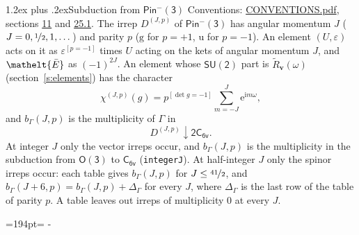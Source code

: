 \documentclass[10pt,a4paper]{article}
\makeatletter
\renewcommand\section{\@startsection{section}{1}{\z@}{-3ex plus -1ex minus -.2ex}%
  {1.2ex plus .2ex}{\normalfont\large\sffamily\bfseries\color{parttitle}}}
\newcommand{\needspace}[1]{\par\penalty-100\begingroup\dimen0=#1\relax\dimen2=\pagegoal
  \advance\dimen2-\pagetotal\ifdim\dimen0>\dimen2\relax\ifdim\dimen2>0pt\vfil\break\fi\fi
  \endgroup}
\numberwithin{equation}{section}
\newcommand{\eltfont}[1]{{\let\sigma\eltsigma\mathelt{#1}}}
\newcommand{\grp}[1]{\mathsf{#1}}
\newcommand{\elt}[1]{\eltfont{#1}}
\newcommand{\ptag}[1]{\mathrm{#1}}
\newcommand{\iverson}[1]{[#1]}
\newcommand{\restr}[2]{#1\!\downarrow#2}
\newcommand{\vv}{\mathbf{v}}
\newcommand{\iunit}{\mathrm{i}}
\newcommand{\expe}{\mathrm{e}}
\newcommand{\irrJp}[2]{D^{(#1,#2)}}
\newcommand{\barred}[1]{\bar{#1}}
\newcommand{\lift}[1]{\tilde{#1}}
\makeatother
\begin{document}
\section{Subduction from \texorpdfstring{$\grp{Pin^{-}(3)}$}{Pin(3)}}\label{s:subduction_parent}
Conventions: \href{../../CONVENTIONS.pdf}{CONVENTIONS.pdf}, sections \href{../../../rotation/CONVENTIONS.pdf\#conv.11}{11} and \href{../../CONVENTIONS.pdf\#conv.25.1}{25.1}.
\leavevmode\label{n:index.J}\label{n:index.parity}\label{n:irrep.o3}The irrep $\irrJp{J}{p}$ of \href{Pinminus3.pdf}{$\grp{Pin^{-}(3)}$} has angular momentum $J$ ($J = 0, \nicefrac{1}{2}, 1, \dots$) and parity $p$ ($\ptag{g}$ for $p = +1$, $\ptag{u}$ for $p = -1$). An element $(U, \varepsilon)$ acts on it as $\varepsilon^{[p = -1]}$ times $U$ acting on the kets of angular momentum $J$, and $\elt{\barred{E}}$ as $(-1)^{2J}$. \label{n:function.character.parent}\label{n:function.multiplicity}An element whose $\grp{SU(2)}$ part is $\lift{R}_{\vv}(\omega)$ (section~\ref{s:elements}) has the character
\begin{equation}\label{e:chi}\chi^{(J,p)}(g) = p^{\iverson{\det g = -1}}\sum_{m=-J}^{J} \expe^{\iunit m\omega},\end{equation}
and $b_\Gamma(J, p)$ is the multiplicity of $\Gamma$ in
\begin{equation}\label{e:parent}\restr{\irrJp{J}{p}}{\grp{2C_{6v}}}.\end{equation}
At integer $J$ only the vector irreps occur, and $b_\Gamma(J, p)$ is the multiplicity in the subduction from $\grp{O(3)}$ to \href{../../../rotation/data/pdf/C6v.pdf}{$\grp{C_{6v}}$} (\texttt{integerJ}). \label{n:index.increment}At half-integer $J$ only the spinor irreps occur: each table gives $b_\Gamma(J, p)$ for $J \le \nicefrac{41}{2}$, and $b_\Gamma(J + 6, p) = b_\Gamma(J, p) + \Delta_\Gamma$ for every $J$, where $\Delta_\Gamma$ is the last row of the table of parity $p$. A table leaves out irreps of multiplicity 0 at every $J$.
\needspace{194pt}
\end{document}
